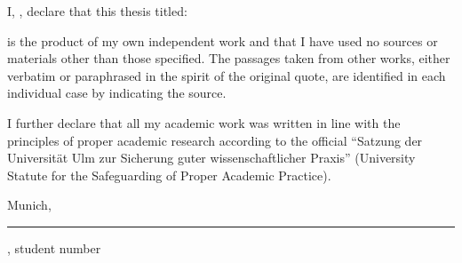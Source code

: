 \documentclass[
11pt, %
english, %
singlespacing, %
headsepline, %
]{MastersDoctoralThesis} %
\begin{document}
 
 

\begin{declaration}
\noindent I, \authorname, declare that this thesis titled:

\begin{center}
    {\bfseries \ttitle}
\end{center}

\noindent is the product of my own independent work and that I have used no sources 
or materials other than those specified. The passages taken from other works, 
either verbatim or paraphrased in the spirit of the original quote, are identified 
in each individual case by indicating the source.

\noindent I further declare that all my academic work was written in line with the principles 
of proper academic research according to the official ``Satzung der Universität 
Ulm zur Sicherung guter wissenschaftlicher Praxis'' (University Statute for the 
Safeguarding of Proper Academic Practice).

\vspace{3cm}

Munich, \hfill \rule{5cm}{0.4pt}

\hfill {\small \authorname, student number}

\end{declaration}
\end{document}
